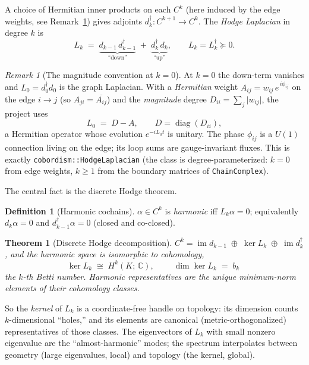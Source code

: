 \documentclass[11pt]{article}
\theoremstyle{plain}
\newtheorem{theorem}{Theorem}
\theoremstyle{definition}
\newtheorem{definition}{Definition}
\theoremstyle{remark}
\newtheorem{remark}{Remark}
\newcommand{\C}{\mathbb{C}}
\newcommand{\adj}{^{\dagger}}
\begin{document}
A choice of Hermitian inner products on each $C^k$ (here induced by the edge
weights, see Remark~\ref{rmk:magnitude}) gives adjoints $d_k\adj : C^{k+1}\to
C^k$. The \emph{Hodge Laplacian} in degree $k$ is
\begin{equation}
L_k \;=\; \underbrace{d_{k-1}\,d_{k-1}\adj}_{\text{``down''}}
\;+\; \underbrace{d_k\adj\, d_k}_{\text{``up''}} ,
\qquad L_k = L_k\adj \succeq 0 .
\end{equation}

\begin{remark}[The magnitude convention at $k=0$]\label{rmk:magnitude}
At $k=0$ the down-term vanishes and $L_0 = d_0\adj d_0$ is the graph Laplacian.
With a \emph{Hermitian} weight $A_{ij} = w_{ij}\,e^{\,i\phi_{ij}}$ on the edge
$i\!\to\!j$ (so $A_{ji}=\overline{A_{ij}}$) and the \emph{magnitude} degree
$D_{ii} = \sum_j \lvert w_{ij}\rvert$, the project uses
\begin{equation}
L_0 \;=\; D - A , \qquad D = \operatorname{diag}(D_{ii}),
\end{equation}
a Hermitian operator whose evolution $e^{-iL_0 t}$ is unitary. The phase
$\phi_{ij}$ is a $U(1)$ connection living on the edge; its loop sums are
gauge-invariant fluxes. This is exactly \texttt{cobordism::HodgeLaplacian} (the
class is degree-parameterized: $k=0$ from edge weights, $k\ge 1$ from the
boundary matrices of \texttt{ChainComplex}).
\end{remark}

The central fact is the discrete Hodge theorem.

\begin{definition}[Harmonic cochains]
$\alpha\in C^k$ is \emph{harmonic} iff $L_k\alpha = 0$; equivalently
$d_k\alpha = 0$ and $d_{k-1}\adj\alpha = 0$ (closed and co-closed).
\end{definition}

\begin{theorem}[Discrete Hodge decomposition]
$C^k = \operatorname{im} d_{k-1} \;\oplus\; \ker L_k \;\oplus\;
\operatorname{im} d_k\adj$, and the harmonic space is isomorphic to cohomology,
\begin{equation}
\ker L_k \;\cong\; H^k(K;\,\C), \qquad
\boxed{\;\dim \ker L_k \;=\; b_k\;}
\end{equation}
the $k$-th Betti number. Harmonic representatives are the unique
minimum-norm elements of their cohomology classes.
\end{theorem}

So the \emph{kernel} of $L_k$ is a coordinate-free handle on topology: its
dimension counts $k$-dimensional ``holes,'' and its elements are canonical
(metric-orthogonalized) representatives of those classes. The eigenvectors of
$L_k$ with small nonzero eigenvalue are the ``almost-harmonic'' modes; the
spectrum interpolates between geometry (large eigenvalues, local) and topology
(the kernel, global).
\end{document}
